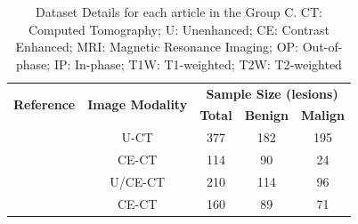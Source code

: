 \documentclass{article}
\begin{document}
\begin{table}[]
    \centering
    \begin{tabular}{ccccc}\toprule
        \multirow{2}{*}{\textbf{Reference}} & \multirow{2}{*}{\textbf{Image Modality}} & \multicolumn{3}{c}{\textbf{Sample Size (lesions)}}
        \\\cmidrule(lr){3-5}
                                            &                                          & \textbf{Total}                                     & \textbf{Benign} & \textbf{Malign} \\\midrule
        \cite{Bi2017}                & U-CT                                     & 377                                                & 182             & 195             \\
        \cite{Bi2022}                  & CE-CT                                    & 114                                                & 90              & 24              \\
        \cite{Kong2022}                       & U/CE-CT                                  & 210                                                & 114             & 96              \\
        \cite{Zheng2020}                 & CE-CT                                    & 160                                                & 89              & 71              \\
        \bottomrule
    \end{tabular}
    \caption{Dataset Details for each article in the Group C. CT: Computed Tomography; U: Unenhanced; CE: Contrast Enhanced; MRI: Magnetic Resonance Imaging; OP: Out-of-phase; IP: In-phase; T1W: T1-weighted; T2W: T2-weighted}
    \label{tab:data_C}
\end{table}
\end{document}
